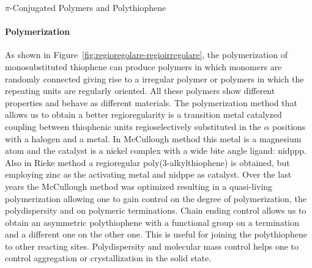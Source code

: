 \begin{section}{$\pi$-Conjugated Polymers and Polythiophene}
\paragraph{Polymerization} As shown in Figure~\ref{fig:regioregolare-regioirregolare}, the polymerization of mono\-substituted thiophene can produce polymers in which monomers are randomly connected giving rise to a irregular polymer or polymers in which the repeating units are regularly oriented. All these polymers show different properties and behave as different materials. 
The polymerization method that allows us to obtain a better regioregularity is a transition metal catalyzed coupling between thiophenic units regioselectively substituted in the $\alpha$ positions with a halogen and a metal. \label{intro-polimerizzazione}
In McCullough method this metal is a magnesium atom and the catalyst is a nickel complex with a wide bite angle 
ligand: \acrfull{nidppp}. 
Also in Rieke method a regioregular poly\-(3-alkyl\-thio\-phene) is obtained, but employing zinc as the activating metal and \acrfull{nidppe} as catalyst. 
Over the last years the McCullough method was optimized resulting in a quasi-living polymerization allowing one to gain control on the degree of polymerization, the polydispersity 
and on polymeric terminations. Chain ending control allows us to obtain an asymmetric polythiophene with a functional group on a termination and a different one on the other one. This is useful for joining the polythiophene to other reacting sites. 
Polydispersity and molecular mass control helps one to control aggregation or crystallization in the solid state. 

\end{section}
